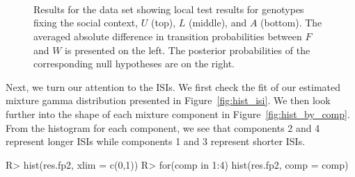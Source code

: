 \begin{figure}[!ht]
\centering
{}\\
\\
\\
\caption{Results for the  data set showing local test results for genotypes fixing the social context, $U$ (top), $L$ (middle), and $A$ (bottom).
The averaged absolute difference in transition probabilities between $F$ and $W$ is presented on the left.
The posterior probabilities of the corresponding null hypotheses are on the right.
 }
\label{fig:local}
\end{figure}


Next, we turn our attention to the ISIs. 
We first check the fit of our estimated mixture gamma distribution presented in Figure~\ref{fig:hist_isi}. 
We then look further into the shape of each mixture component in Figure~\ref{fig:hist_by_comp}. 
{From the histogram for each component, we see that components 2 and 4 represent longer ISIs while components 1 and 3 represent shorter ISIs.}


\begin{example}
R> hist(res.fp2, xlim = c(0,1))
R> for(comp in 1:4) {
     hist(res.fp2, comp = comp)
   }
\end{example}

